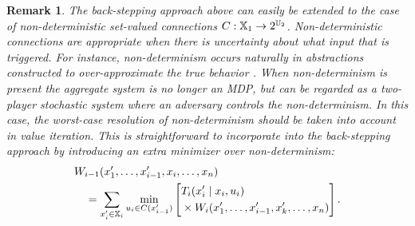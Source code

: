 \documentclass[conference]{IEEEtran}
\renewcommand{\cite}[1]{\citep{#1}}
\newtheorem{remark}{Remark}
\begin{document}


\begin{remark}
	The back-stepping approach above can easily be extended to the case of \emph{non-deterministic} set-valued connections $C : \mathbb{X}_1 \rightarrow 2^{\mathbb{U}_2}$. Non-deterministic connections are appropriate when there is uncertainty about what input that is triggered. For instance, non-determinism occurs naturally in abstractions constructed to over-approximate the true behavior \cite{Haesaert18}. When non-determinism is present the aggregate system is no longer an MDP, but can be regarded as a two-player stochastic system where an adversary controls the non-determinism. In this case, the worst-case resolution of non-determinism should be taken into account in value iteration. This is straightforward to incorporate into the back-stepping approach by introducing an extra minimizer over non-determinism:
	\begin{equation*}
	\begin{aligned}
	  & W_{i-1}(x_1', \ldots, x_{i-1}', x_i, \ldots, x_n) \\
	  & \quad = \sum_{x_{i}' \in \mathbb{X}_{i}} \min_{u_i \in C(x_{i-1}')} \left[ \begin{aligned} & T_{i} (x_{i}' \mid x_{i}, u_i) \\
	   & \times W_{i} (x_1', \ldots, x_{i-1}', x_k', \ldots, x_n)
	    \end{aligned} \right].
	\end{aligned}
	\end{equation*}
\end{remark}


\end{document}
